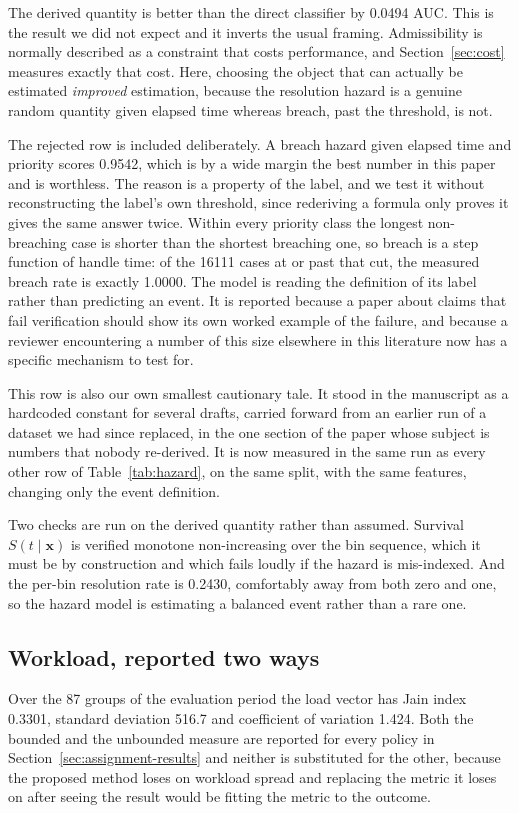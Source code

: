 The derived quantity is better than the direct classifier by \num{0.0494} AUC. This is the
result we did not expect and it inverts the usual framing. Admissibility is normally described
as a constraint that costs performance, and Section~\ref{sec:cost} measures exactly that cost.
Here, choosing the object that can actually be estimated \emph{improved} estimation, because the
resolution hazard is a genuine random quantity given elapsed time whereas breach, past the
threshold, is not.

The rejected row is included deliberately. A breach hazard given elapsed time and priority
scores \num{0.9542}, which is by a wide margin the best number in this paper and is worthless.
The reason is a property of the label, and we test it without reconstructing the label's own
threshold, since rederiving a formula only proves it gives the same answer twice. Within every
priority class the longest non-breaching case is shorter than the shortest breaching one, so
breach is a step function of handle time: of the \num{16111} cases at or past that cut, the
measured breach rate is exactly \num{1.0000}. The model is reading the definition of its
label rather than predicting an event. It is reported because a paper about claims that fail
verification should show its own worked example of the failure, and because a reviewer
encountering a number of this size elsewhere in this literature now has a specific mechanism
to test for.

This row is also our own smallest cautionary tale. It stood in the manuscript as a hardcoded
constant for several drafts, carried forward from an earlier run of a dataset we had since
replaced, in the one section of the paper whose subject is numbers that nobody re-derived. It
is now measured in the same run as every other row of Table~\ref{tab:hazard}, on the same
split, with the same features, changing only the event definition.

Two checks are run on the derived quantity rather than assumed. Survival $S(t\mid\mathbf{x})$ is
verified monotone non-increasing over the bin sequence, which it must be by construction and
which fails loudly if the hazard is mis-indexed. And the per-bin resolution rate is
\num{0.2430}, comfortably away from both zero and one, so the hazard model is estimating a
balanced event rather than a rare one.

\subsection{Workload, reported two ways}

Over the \num{87} groups of the evaluation period the load vector has Jain index \num{0.3301},
standard deviation \num{516.7} and coefficient of variation \num{1.424}. Both the bounded and
the unbounded measure are reported for every policy in Section~\ref{sec:assignment-results} and
neither is substituted for the other, because the proposed method loses on workload spread and
replacing the metric it loses on after seeing the result would be fitting the metric to the
outcome.
